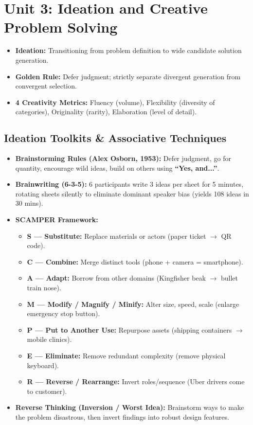 \chapter{Unit 3: Ideation and Creative Problem Solving}
\label{chap:unit3_rev}

\begin{revbox}
\begin{itemize}[leftmargin=1.2em, itemsep=2pt]
    \item \textbf{Ideation:} Transitioning from problem definition to wide candidate solution generation.
    \item \textbf{Golden Rule:} Defer judgment; strictly separate divergent generation from convergent selection.
    \item \textbf{4 Creativity Metrics:} Fluency (volume), Flexibility (diversity of categories), Originality (rarity), Elaboration (level of detail).
\end{itemize}
\end{revbox}

\section{Ideation Toolkits \& Associative Techniques}

\begin{itemize}[leftmargin=1.2em, itemsep=3pt]
    \item \textbf{Brainstorming Rules (Alex Osborn, 1953):} Defer judgment, go for quantity, encourage wild ideas, build on others using \textbf{``Yes, and...''}.
    \item \textbf{Brainwriting (6-3-5):} 6 participants write 3 ideas per sheet for 5 minutes, rotating sheets silently to eliminate dominant speaker bias (yields 108 ideas in 30 mins).
    \item \textbf{SCAMPER Framework:}
    \begin{itemize}
        \item \textbf{S --- Substitute:} Replace materials or actors (paper ticket $\rightarrow$ QR code).
        \item \textbf{C --- Combine:} Merge distinct tools (phone + camera = smartphone).
        \item \textbf{A --- Adapt:} Borrow from other domains (Kingfisher beak $\rightarrow$ bullet train nose).
        \item \textbf{M --- Modify / Magnify / Minify:} Alter size, speed, scale (enlarge emergency stop button).
        \item \textbf{P --- Put to Another Use:} Repurpose assets (shipping containers $\rightarrow$ mobile clinics).
        \item \textbf{E --- Eliminate:} Remove redundant complexity (remove physical keyboard).
        \item \textbf{R --- Reverse / Rearrange:} Invert roles/sequence (Uber drivers come to customer).
    \end{itemize}
    \item \textbf{Reverse Thinking (Inversion / Worst Idea):} Brainstorm ways to make the problem disastrous, then invert findings into robust design features.
\end{itemize}


